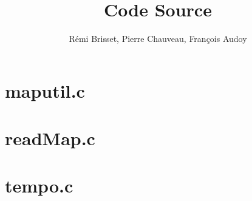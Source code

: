 \documentclass[10pt, a4paper]{article}
\title{Code Source}
\author{ Rémi Brisset, Pierre Chauveau, François Audoy}
\begin{document}
\maketitle
\tableofcontents

\newpage
\section{maputil.c}


\newpage
\section{readMap.c}


\newpage
\section{tempo.c}

\end{document}
